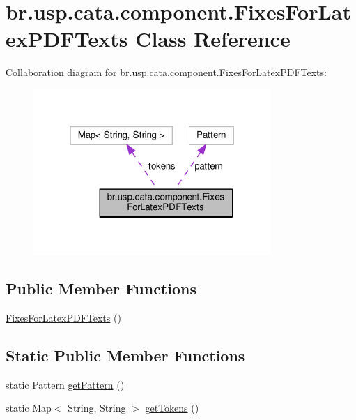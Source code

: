 \hypertarget{classbr_1_1usp_1_1cata_1_1component_1_1_fixes_for_latex_p_d_f_texts}{\section{br.\+usp.\+cata.\+component.\+Fixes\+For\+Latex\+P\+D\+F\+Texts Class Reference}
\label{classbr_1_1usp_1_1cata_1_1component_1_1_fixes_for_latex_p_d_f_texts}
}


Collaboration diagram for br.\+usp.\+cata.\+component.\+Fixes\+For\+Latex\+P\+D\+F\+Texts\+:\nopagebreak
\begin{figure}[H]
\begin{center}
\leavevmode
\includegraphics[width=256pt]{classbr_1_1usp_1_1cata_1_1component_1_1_fixes_for_latex_p_d_f_texts__coll__graph}
\end{center}
\end{figure}
\subsection*{Public Member Functions}
\begin{DoxyCompactItemize}
\item 
\hyperlink{classbr_1_1usp_1_1cata_1_1component_1_1_fixes_for_latex_p_d_f_texts_a9d0fb5ae097d6b100f447043a971e67f}{Fixes\+For\+Latex\+P\+D\+F\+Texts} ()
\end{DoxyCompactItemize}
\subsection*{Static Public Member Functions}
\begin{DoxyCompactItemize}
\item 
static Pattern \hyperlink{classbr_1_1usp_1_1cata_1_1component_1_1_fixes_for_latex_p_d_f_texts_a1ac760087285036aa519d24fe8c8cd87}{get\+Pattern} ()
\item 
static Map$<$ String, String $>$ \hyperlink{classbr_1_1usp_1_1cata_1_1component_1_1_fixes_for_latex_p_d_f_texts_aedbe3de3944def553eff12cc754d6e8c}{get\+Tokens} ()
\end{DoxyCompactItemize}
